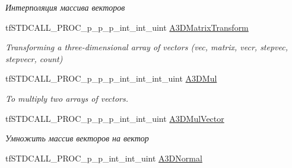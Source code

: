 \begin{DoxyCompactItemize}
\begin{DoxyCompactList}\small\item\em Интерполяция массива векторов \end{DoxyCompactList}\item 
\hypertarget{structs_functions_array_vector_c_p_u_aded183fd8004b9968f2baa1db170e159}{tf\-S\-T\-D\-C\-A\-L\-L\-\_\-\-P\-R\-O\-C\-\_\-p\-\_\-p\-\_\-p\-\_\-int\-\_\-int\-\_\-uint \hyperlink{structs_functions_array_vector_c_p_u_aded183fd8004b9968f2baa1db170e159}{A3\-D\-Matrix\-Transform}}\label{structs_functions_array_vector_c_p_u_aded183fd8004b9968f2baa1db170e159}

\begin{DoxyCompactList}\small\item\em Transforming a three-\/dimensional array of vectors (vec, matrix, vecr, stepvec, stepvecr, count) \end{DoxyCompactList}\item 
\hypertarget{structs_functions_array_vector_c_p_u_ae58af96e2fa5570273ac385f55cd807f}{tf\-S\-T\-D\-C\-A\-L\-L\-\_\-\-P\-R\-O\-C\-\_\-p\-\_\-p\-\_\-p\-\_\-int\-\_\-int\-\_\-int\-\_\-uint \hyperlink{structs_functions_array_vector_c_p_u_ae58af96e2fa5570273ac385f55cd807f}{A3\-D\-Mul}}\label{structs_functions_array_vector_c_p_u_ae58af96e2fa5570273ac385f55cd807f}

\begin{DoxyCompactList}\small\item\em To multiply two arrays of vectors. \end{DoxyCompactList}\item 
\hypertarget{structs_functions_array_vector_c_p_u_ae646f2350db6ced0717d1f60cda6bec8}{tf\-S\-T\-D\-C\-A\-L\-L\-\_\-\-P\-R\-O\-C\-\_\-p\-\_\-p\-\_\-p\-\_\-int\-\_\-int\-\_\-uint \hyperlink{structs_functions_array_vector_c_p_u_ae646f2350db6ced0717d1f60cda6bec8}{A3\-D\-Mul\-Vector}}\label{structs_functions_array_vector_c_p_u_ae646f2350db6ced0717d1f60cda6bec8}

\begin{DoxyCompactList}\small\item\em Умножить массив векторов на вектор \end{DoxyCompactList}\item 
\hypertarget{structs_functions_array_vector_c_p_u_a00d672b91f42780ee2b1775e5226c119}{tf\-S\-T\-D\-C\-A\-L\-L\-\_\-\-P\-R\-O\-C\-\_\-p\-\_\-p\-\_\-int\-\_\-int\-\_\-uint \hyperlink{structs_functions_array_vector_c_p_u_a00d672b91f42780ee2b1775e5226c119}{A3\-D\-Normal}}\label{structs_functions_array_vector_c_p_u_a00d672b91f42780ee2b1775e5226c119}


\end{DoxyCompactItemize}
